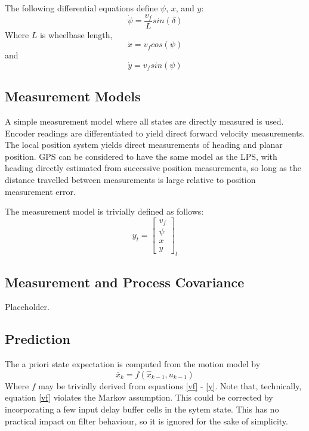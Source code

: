 \documentclass[11pt]{article} %
\begin{document}
The following differential equations define $\psi$, $x$, and $y$:
\begin{equation}
\dot{\psi} = \frac{v_f}{L} sin(\delta)
\end{equation}
Where $L$ is wheelbase length,
\begin{equation}
\dot{x} = v_f cos( \psi )
\end{equation}
and
\begin{equation}
\dot{y} = v_f sin( \psi )
\label{y}
\end{equation}

\subsection{Measurement Models}

A simple measurement model where all states are directly measured is used.  Encoder readings are differentiated to yield direct forward velocity measurements.
The local position system yields direct measurements of heading and planar position.  
GPS can be considered to have the same model as the LPS, with heading directly estimated from successive position measurements, so long as the distance travelled between measurements is large relative to position measurement error.

The measurement model is trivially defined as follows:
\begin{equation}
y_t = \left[ \begin{array}{c} v_f \\ \psi \\ x \\ y \end{array} \right]_t
\end{equation}

\subsection{Measurement and Process Covariance}

Placeholder.

\subsection{Prediction}

The a priori state expectation is computed from the motion model by
\begin{equation}
\bar{x}_k = f(\hat{x}_{k-1}, u_{k-1})
\end{equation}
Where $f$ may be trivially derived from equations \ref{vf} - \ref{y}.  Note that, technically, equation \ref{vf} violates the Markov assumption.  This could be corrected by incorporating a few input delay buffer cells in the sytem state.  This has no practical impact on filter behaviour, so it is ignored for the sake of simplicity.
\end{document}
